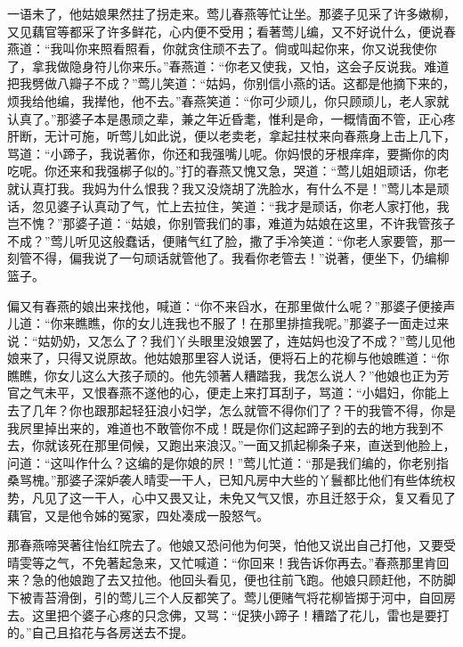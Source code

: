 \begin{parag}
    一语未了，他姑娘果然拄了拐走来。莺儿春燕等忙让坐。那婆子见采了许多嫩柳，又见藕官等都采了许多鲜花，心内便不受用；看著莺儿编，又不好说什么，便说春燕道：“我叫你来照看照看，你就贪住顽不去了。倘或叫起你来，你又说我使你了，拿我做隐身符儿你来乐。”春燕道：“你老又使我，又怕，这会子反说我。难道把我劈做八瓣子不成？”莺儿笑道：“姑妈，你别信小燕的话。这都是他摘下来的，烦我给他编，我撵他，他不去。”春燕笑道：“你可少顽儿，你只顾顽儿，老人家就认真了。”那婆子本是愚顽之辈，兼之年近昏耄，惟利是命，一概情面不管，正心疼肝断，无计可施，听莺儿如此说，便以老卖老，拿起拄杖来向春燕身上击上几下，骂道：“小蹄子，我说著你，你还和我强嘴儿呢。你妈恨的牙根痒痒，要撕你的肉吃呢。你还来和我强梆子似的。”打的春燕又愧又急，哭道：“莺儿姐姐顽话，你老就认真打我。我妈为什么恨我？我又没烧胡了洗脸水，有什么不是！”莺儿本是顽话，忽见婆子认真动了气，忙上去拉住，笑道：“我才是顽话，你老人家打他，我岂不愧？”那婆子道：“姑娘，你别管我们的事，难道为姑娘在这里，不许我管孩子不成？”莺儿听见这般蠢话，便赌气红了脸，撒了手冷笑道：“你老人家要管，那一刻管不得，偏我说了一句顽话就管他了。我看你老管去！”说著，便坐下，仍编柳篮子。
\end{parag}


\begin{parag}
    偏又有春燕的娘出来找他，喊道：“你不来舀水，在那里做什么呢？”那婆子便接声儿道：“你来瞧瞧，你的女儿连我也不服了！在那里排揎我呢。”那婆子一面走过来说：“姑奶奶，又怎么了？我们丫头眼里没娘罢了，连姑妈也没了不成？”莺儿见他娘来了，只得又说原故。他姑娘那里容人说话，便将石上的花柳与他娘瞧道：“你瞧瞧，你女儿这么大孩子顽的。他先领著人糟踏我，我怎么说人？”他娘也正为芳官之气未平，又恨春燕不遂他的心，便走上来打耳刮子，骂道：“小娼妇，你能上去了几年？你也跟那起轻狂浪小妇学，怎么就管不得你们了？干的我管不得，你是我屄里掉出来的，难道也不敢管你不成！既是你们这起蹄子到的去的地方我到不去，你就该死在那里伺候，又跑出来浪汉。”一面又抓起柳条子来，直送到他脸上，问道：“这叫作什么？这编的是你娘的屄！”莺儿忙道：“那是我们编的，你老别指桑骂槐。”那婆子深妒袭人晴雯一干人，已知凡房中大些的丫鬟都比他们有些体统权势，凡见了这一干人，心中又畏又让，未免又气又恨，亦且迁怒于众，复又看见了藕官，又是他令姊的冤家，四处凑成一股怒气。
\end{parag}


\begin{parag}
    那春燕啼哭著往怡红院去了。他娘又恐问他为何哭，怕他又说出自己打他，又要受晴雯等之气，不免著起急来，又忙喊道：“你回来！我告诉你再去。”春燕那里肯回来？急的他娘跑了去又拉他。他回头看见，便也往前飞跑。他娘只顾赶他，不防脚下被青苔滑倒，引的莺儿三个人反都笑了。莺儿便赌气将花柳皆掷于河中，自回房去。这里把个婆子心疼的只念佛，又骂：“促狭小蹄子！糟踏了花儿，雷也是要打的。”自己且掐花与各房送去不提。
\end{parag}


